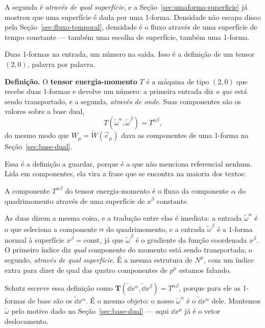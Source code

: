 \documentclass[12pt,a4paper,oneside]{book}
\theoremstyle{rgplain}
\theoremstyle{rgremark}
\begin{document}
A segunda é \emph{através de qual superfície}, e a
Seção~\ref{sec:umaforma-superficie} já mostrou que uma superfície é dada por
uma 1-forma. Densidade não escapa disso: pela Seção~\ref{sec:fluxo-temporal},
densidade é o fluxo através de uma superfície de tempo constante --- também
uma escolha de superfície, também uma 1-forma.

Duas 1-formas na entrada, um número na saída. Isso é a definição de um tensor
$(2,0)$, palavra por palavra.

\begin{central}
\textbf{Definição.} O \textbf{tensor energia-momento} $T$ é a máquina de tipo
$(2,0)$ que recebe duas 1-formas e devolve um número: a primeira entrada diz
\emph{o que} está sendo transportado, e a segunda, \emph{através de onde}.
Suas componentes são os valores sobre a base dual,
\[
  T(\tilde\omega^\alpha,\tilde\omega^\beta)=T^{\alpha\beta} ,
\]
do mesmo modo que $W_\mu=\tilde W(\vec e_\mu)$ dava as componentes de uma
1-forma na Seção~\ref{sec:base-dual}.
\end{central}

Essa é a definição a guardar, porque é a que não menciona referencial nenhum.
Lida em componentes, ela vira a frase que se encontra na maioria dos textos:

\begin{resultado}[title={\sffamily\bfseries\footnotesize\color{rgAmbar}A MESMA COISA, EM COMPONENTES}]
A componente $T^{\alpha\beta}$ do tensor energia-momento é o fluxo da
componente $\alpha$ do quadrimomento através de uma superfície de $x^\beta$
constante.
\end{resultado}

As duas dizem a mesma coisa, e a tradução entre elas é imediata: a entrada
$\tilde\omega^\alpha$ é o que seleciona a componente $\alpha$ do quadrimomento,
e a entrada $\tilde\omega^\beta$ é a 1-forma normal à superfície
$x^\beta=\text{const}$, já que $\tilde\omega^\beta$ é o gradiente da função
coordenada $x^\beta$. O primeiro índice diz \emph{qual} componente do momento
está sendo transportada; o segundo, \emph{através de qual superfície}. É a
mesma estrutura de $N^\mu$, com um índice extra para dizer de qual das quatro
componentes de $p^\mu$ estamos falando.

\begin{atencao}[title={\sffamily\bfseries\footnotesize\color{rgTerracota}LENDO O SCHUTZ AO LADO}]
Schutz escreve essa definição como
$\mathbf{T}(\tilde{\dd}x^\alpha,\tilde{\dd}x^\beta)=T^{\alpha\beta}$, porque
para ele as 1-formas de base são os $\tilde{\dd}x^\alpha$. É o mesmo objeto:
o nosso $\tilde\omega^\alpha$ é o $\tilde{\dd}x^\alpha$ dele. Mantemos
$\tilde\omega$ pelo motivo dado na Seção~\ref{sec:base-dual} --- aqui
$\dd x^\mu$ já é o vetor deslocamento.
\end{atencao}
\end{document}
